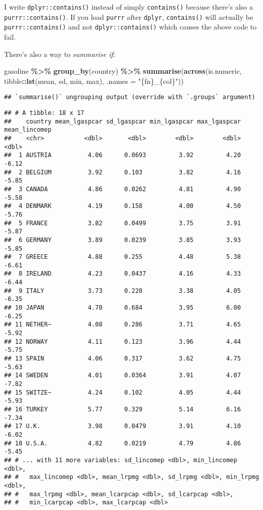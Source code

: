\documentclass[
]{article}
\newenvironment{Shaded}{\begin{snugshade}}{\end{snugshade}}
\newcommand{\DataTypeTok}[1]{\textcolor[rgb]{0.13,0.29,0.53}{#1}}
\newcommand{\KeywordTok}[1]{\textcolor[rgb]{0.13,0.29,0.53}{\textbf{#1}}}
\newcommand{\NormalTok}[1]{#1}
\newcommand{\OperatorTok}[1]{\textcolor[rgb]{0.81,0.36,0.00}{\textbf{#1}}}
\newcommand{\StringTok}[1]{\textcolor[rgb]{0.31,0.60,0.02}{#1}}
\begin{document}
I write \texttt{dplyr::contains()} instead of simply \texttt{contains()} because there's also a
\texttt{purrr::contains()}. If you load \texttt{purrr} after \texttt{dplyr}, \texttt{contains()} will actually be
\texttt{purrr::contains()} and not \texttt{dplyr::contains()} which causes the above code to fail.

There's also a way to \emph{summarise if}:

\begin{Shaded}
\begin{Highlighting}[]
\NormalTok{gasoline }\OperatorTok{\%\textgreater{}\%}
\StringTok{  }\KeywordTok{group\_by}\NormalTok{(country) }\OperatorTok{\%\textgreater{}\%}
\StringTok{  }\KeywordTok{summarise}\NormalTok{(}\KeywordTok{across}\NormalTok{(is.numeric, tibble}\OperatorTok{::}\KeywordTok{lst}\NormalTok{(mean, sd, min, max), }\DataTypeTok{.names =} \StringTok{"\{fn\}\_\{col\}"}\NormalTok{))}
\end{Highlighting}
\end{Shaded}

\begin{verbatim}
## `summarise()` ungrouping output (override with `.groups` argument)
\end{verbatim}

\begin{verbatim}
## # A tibble: 18 x 17
##    country mean_lgaspcar sd_lgaspcar min_lgaspcar max_lgaspcar mean_lincomep
##    <chr>           <dbl>       <dbl>        <dbl>        <dbl>         <dbl>
##  1 AUSTRIA          4.06      0.0693         3.92         4.20         -6.12
##  2 BELGIUM          3.92      0.103          3.82         4.16         -5.85
##  3 CANADA           4.86      0.0262         4.81         4.90         -5.58
##  4 DENMARK          4.19      0.158          4.00         4.50         -5.76
##  5 FRANCE           3.82      0.0499         3.75         3.91         -5.87
##  6 GERMANY          3.89      0.0239         3.85         3.93         -5.85
##  7 GREECE           4.88      0.255          4.48         5.38         -6.61
##  8 IRELAND          4.23      0.0437         4.16         4.33         -6.44
##  9 ITALY            3.73      0.220          3.38         4.05         -6.35
## 10 JAPAN            4.70      0.684          3.95         6.00         -6.25
## 11 NETHER~          4.08      0.286          3.71         4.65         -5.92
## 12 NORWAY           4.11      0.123          3.96         4.44         -5.75
## 13 SPAIN            4.06      0.317          3.62         4.75         -5.63
## 14 SWEDEN           4.01      0.0364         3.91         4.07         -7.82
## 15 SWITZE~          4.24      0.102          4.05         4.44         -5.93
## 16 TURKEY           5.77      0.329          5.14         6.16         -7.34
## 17 U.K.             3.98      0.0479         3.91         4.10         -6.02
## 18 U.S.A.           4.82      0.0219         4.79         4.86         -5.45
## # ... with 11 more variables: sd_lincomep <dbl>, min_lincomep <dbl>,
## #   max_lincomep <dbl>, mean_lrpmg <dbl>, sd_lrpmg <dbl>, min_lrpmg <dbl>,
## #   max_lrpmg <dbl>, mean_lcarpcap <dbl>, sd_lcarpcap <dbl>,
## #   min_lcarpcap <dbl>, max_lcarpcap <dbl>
\end{verbatim}
\end{document}
